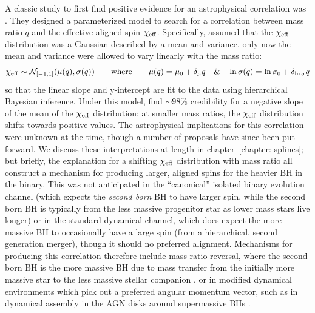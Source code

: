 \begin{refsection}
A classic study to first find positive evidence for an astrophysical correlation was \citet{Callister:2021fpo}. They designed a parameterized model to search for a correlation between mass ratio $q$ and the effective aligned spin $\chi_{\rm eff}$. Specifically, \citet{Callister:2021fpo} assumed that the $\chi_{\rm eff}$ distribution was a Gaussian described by a mean and variance, only now the mean and variance were allowed to vary linearly with the mass ratio: 
\begin{equation}
    \chi_{\rm eff} \sim \mathcal{N}_{[-1,1]}(\mu(q),\sigma(q)) \qquad\text{where}\qquad \mu(q) = \mu_0+\delta_\mu q  \quad \& \quad \ln\sigma(q) = \ln\sigma_0 + \delta_{\ln\sigma}q  
\end{equation}
so that the linear slope and y-intercept are fit to the data using hierarchical Bayesian inference. Under this model, \citet{Callister:2021fpo} find $\sim 98\%$ credibility for a negative slope of the mean of the $\chi_{\rm eff}$ distribution: at smaller mass ratios, the $\chi_{\rm eff}$ distribution shifts towards positive values. The astrophysical implications for this correlation were unknown at the time, though a number of proposals have since been put forward. We discuss these interpretations at length in chapter~\ref{chapter: splines}; but briefly, the explanation for a shifting $\chi_{\rm eff}$ distribution with mass ratio all construct a mechanism for producing larger, aligned spins for the heavier \ac{BH} in the binary. This was not anticipated in the ``canonical'' isolated binary evolution channel (which expects the \textit{second born} \ac{BH} to have larger spin, while the second born \ac{BH} is typically from the less massive progenitor star as lower mass stars live longer) or in the standard dynamical channel, which does expect the more massive \ac{BH} to occasionally have a large spin (from a hierarchical, second generation merger), though it should no preferred alignment. Mechanisms for producing this correlation therefore include mass ratio reversal, where the second born \ac{BH} is the more massive \ac{BH} due to mass transfer from the initially more massive star to the less massive stellar companion \citep[e.g.,][]{portegies_zwart_population_1996, kaspi_discovery_2000, Broekgaarden:2022nst}, or in modified dynamical environments which pick out a preferred angular momentum vector, such as in dynamical assembly in the AGN disks around supermassive \acp{BH} \citep[e.g.,][]{McKernan:2019beu,Santini:2023ukl}. 


\end{refsection}
